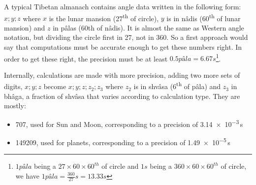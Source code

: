 


A typical Tibetan almanach contains angle data written in the following form: $x;y;z$ where $x$ is the lunar mansion (27\textsuperscript{th} of circle), $y$ is in nâdis (60\textsuperscript{th} of lunar mansion) and $z$ in pâlas (60th of nâdis). It is almost the same as Western angle notation, but dividing the circle first in 27, not in 360. So a first approach would say that computations must be accurate enough to get these numbers right. In order to get these right, the precision must be at least $0.5 pâla = 6.67 s$\footnote{$1 pâla$ being a $27\times60\times60^{th}$ of circle and $1s$ being a $360\times60\times60^{th}$ of circle, we have $1 pâla = \frac{360}{27} s = 13.33 s$}.

Internally, calculations are made with more precision, adding two more sets of digits, $x;y;z$ become $x;y;z;z_2;z_3$ where $z_2$ is in shvâsa (6\textsuperscript{th} of pâla) and $z_3$ in bhâga, a fraction of shvâsa that varies according to calculation type. They are mostly:
\begin{itemize}
\item 707, used for Sun and Moon, corresponding to a precision of \num{3.14e-3}\,s
\item 149209, used for planets, corresponding to a precision of \num{1.49e-5}\,s
\end{itemize}


